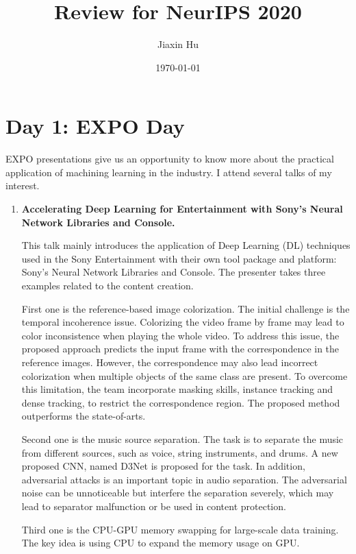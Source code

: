 \documentclass[11pt]{article}
\title{Review for NeurIPS 2020}
\date{\today}
\author{%
Jiaxin Hu
}
\theoremstyle{plain}
\theoremstyle{definition}
\begin{document}

\maketitle
\section{Day 1: EXPO Day}
EXPO presentations give us an opportunity to know more about the practical application of machining learning in the industry. I attend several talks of my interest.
\begin{enumerate}
	\item \textbf{Accelerating Deep Learning for Entertainment with Sony's Neural Network Libraries and Console.}  
	
	\vspace{0.2cm}
	This talk mainly introduces the application of Deep Learning (DL) techniques used in the Sony Entertainment with their own tool package and platform: Sony's Neural Network Libraries and Console. The presenter takes three examples related to the content creation. 
	
	First one is the reference-based image colorization. The initial challenge is the temporal incoherence issue. Colorizing the video frame by frame may lead to color inconsistence when playing the whole video. To address this issue, the proposed approach predicts the input frame with the correspondence in the reference images. However, the correspondence may also lead incorrect colorization when multiple objects of the same class are present. To overcome this limitation, the team incorporate masking skills, instance tracking and dense tracking, to restrict the correspondence region. The proposed method outperforms the state-of-arts.
	
	Second one is the music source separation. The task is to separate the music from different sources, such as voice, string instruments, and drums. A new proposed CNN, named D3Net is proposed for the task. In addition, adversarial attacks is an important topic in audio separation. The adversarial noise can be unnoticeable but interfere the separation severely, which may lead to separator malfunction or be used in content protection.
	
	Third one is the CPU-GPU memory swapping for large-scale data training. The key idea is using CPU to expand the memory usage on GPU.
\end{enumerate}
\end{document}
